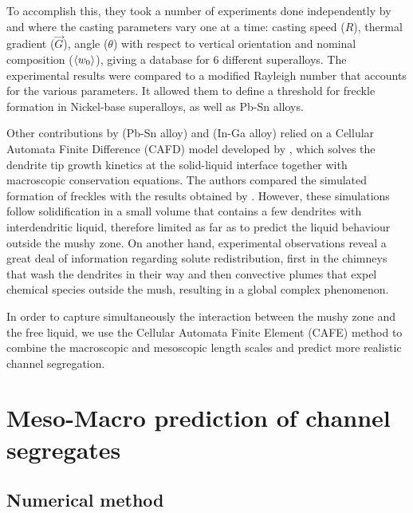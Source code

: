 To accomplish this, they took a number of experiments done independently by \citet{pollock_breakdown_1996} and \citet{auburtin_freckle_2000} 
where the casting parameters vary one at a time: casting speed ($R$), thermal gradient ($\vec{G}$), angle ($\theta$) with respect to vertical 
orientation and nominal composition ($\left \langle w_0 \right \rangle$), giving a database for 6 different superalloys. The experimental results were 
compared to a modified Rayleigh number that accounts for the various parameters. It allowed them to define a threshold for freckle 
formation in Nickel-base superalloys, as well as Pb-Sn alloys.

Other contributions by \citet{yuan_new_2012} (Pb-Sn alloy) and  \citet{karagadde_3-d_2014} (In-Ga alloy) relied on a Cellular Automata Finite Difference
(CAFD) model developed by \citet{lee_modeling_2002}, which  solves the dendrite tip growth kinetics at 
the solid-liquid interface together with macroscopic conservation equations. 
The authors compared the simulated formation of freckles with the results obtained by \citet{shevchenko_chimney_2013}.
However, these simulations follow solidification in a small volume that contains a few dendrites with interdendritic liquid, 
therefore limited as far as to predict the liquid behaviour outside the mushy zone.
On another hand, experimental observations reveal a great deal of information 
regarding solute redistribution, first in the chimneys that wash the dendrites in their 
way and then convective plumes that expel chemical species outside the mush, resulting in a global complex phenomenon.

In order to capture simultaneously the interaction between the mushy zone and the free liquid, we use 
the Cellular Automata Finite Element (CAFE) method to combine the macroscopic and mesoscopic length scales
and predict more realistic channel segregation.

\section{Meso-Macro prediction of channel segregates}

\subsection{Numerical method}

